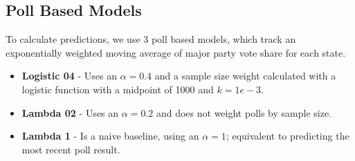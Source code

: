 \subsection{Poll Based Models}
To calculate predictions, we use 3 poll based models, which track an exponentially weighted moving average of major party vote share for each state.

\begin{itemize}
    \item {\bf Logistic 04} - Uses an $\alpha = 0.4$ and a sample size weight calculated with a logistic function with a midpoint of 1000 and $k=1e-3$.
    \item {\bf Lambda 02} - Uses an $\alpha = 0.2$ and does not weight polls by sample size.
    \item {\bf Lambda 1} - Is a naive baseline, using an $\alpha = 1$; equivalent to predicting the most recent poll result.
\end{itemize}


